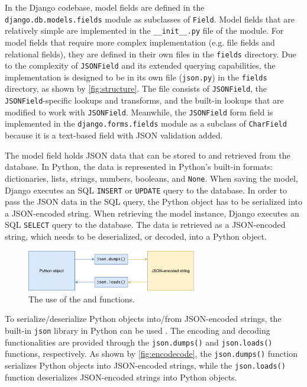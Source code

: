 In the Django codebase, model fields are defined in the
\verb|django.db.models.fields| module as subclasses of \verb|Field|. Model
fields that are relatively simple are implemented in the \verb|__init__.py|
file of the module. For model fields that require more complex implementation
(e.g. file fields and relational fields), they are defined in their own files
in the \verb|fields| directory. Due to the complexity of \verb|JSONField| and
its extended querying capabilities, the implementation is designed to be in its
own file (\verb|json.py|) in the \verb|fields| directory, as shown by
\autoref{fig:structure}. The file consists of \verb|JSONField|, the
\verb|JSONField|-specific lookups and transforms, and the built-in lookups that
are modified to work with \verb|JSONField|. Meanwhile, the \verb|JSONField|
form field is implemented in the \verb|django.forms.fields| module as a
subclass of \verb|CharField| because it is a text-based field with JSON
validation added.

The model field holds JSON data that can be stored to and retrieved from the
database. In Python, the data is represented in Python's built-in formats:
dictionaries, lists, strings, numbers, booleans, and \verb|None|. When saving
the model, Django executes an SQL \verb|INSERT| or \verb|UPDATE| query to the
database. In order to pass the JSON data in the SQL query, the Python object
has to be serialized into a JSON-encoded string. When retrieving the model
instance, Django executes an SQL \verb|SELECT| query to the database. The data
is retrieved as a JSON-encoded string, which needs to be deserialized, or
decoded, into a Python object.

\begin{figure}
	\centering
    \includegraphics[width=0.66\textwidth]{pics/encodecode.png}
	\caption{The use of the  and 
	functions.}
	\label{fig:encodecode}
\end{figure}

To serialize/deserialize Python objects into/from JSON-encoded strings, the
built-in \verb|json| library in Python can be used \cite{python:json}. The
encoding and decoding functionalities are provided through the
\verb|json.dumps()| and \verb|json.loads()| functions, respectively. As shown
by \autoref{fig:encodecode}, the \verb|json.dumps()| function serializes Python
objects into JSON-encoded strings, while the \verb|json.loads()| function
deserializes JSON-encoded strings into Python objects.

